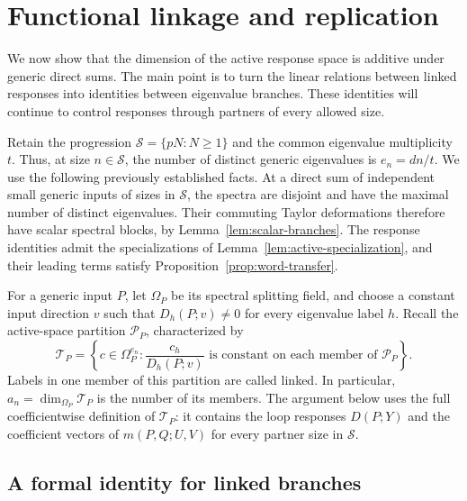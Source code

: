 \section{Functional linkage and replication}
\label{sec:linkage-replication}

We now show that the dimension of the active response space is additive
under generic direct sums.  The main point is to turn the linear relations
between linked responses into identities between eigenvalue branches.
These identities will continue to control responses through partners of
every allowed size.

Retain the progression $\mathcal S=\{pN:N\geq 1\}$ and the common
eigenvalue multiplicity $t$.  Thus, at size $n\in\mathcal S$, the number
of distinct generic eigenvalues is $e_n=dn/t$.  We use the following
previously established facts.  At a direct sum of independent small
generic inputs of sizes in $\mathcal S$, the spectra are disjoint and
have the maximal number of distinct eigenvalues.  Their commuting
Taylor deformations therefore have scalar spectral blocks, by
Lemma~\ref{lem:scalar-branches}.  The response identities admit the
specializations of Lemma~\ref{lem:active-specialization}, and their
leading terms satisfy Proposition~\ref{prop:word-transfer}.

For a generic input $P$, let $\Omega_P$ be its spectral splitting
field, and choose a constant input direction $v$ such that
$D_h(P;v)\neq 0$ for every eigenvalue label $h$.  Recall the active-space
partition $\mathcal P_P$, characterized by
\begin{equation}
 \mathcal T_P
 =\left\{c\in\Omega_P^{e_n}:
       \frac{c_h}{D_h(P;v)}
       \text{ is constant on each member of }\mathcal P_P\right\}.
 \label{eq:linkage-partition}
\end{equation}
Labels in one member of this partition are called linked.  In particular,
$a_n=\dim_{\Omega_P}\mathcal T_P$ is the number of its members.
The argument below uses the full coefficientwise definition of
$\mathcal T_P$: it contains the loop responses $D(P;Y)$ and the
coefficient vectors of $m(P,Q;U,V)$ for every partner size in
$\mathcal S$.

\subsection{A formal identity for linked branches}

